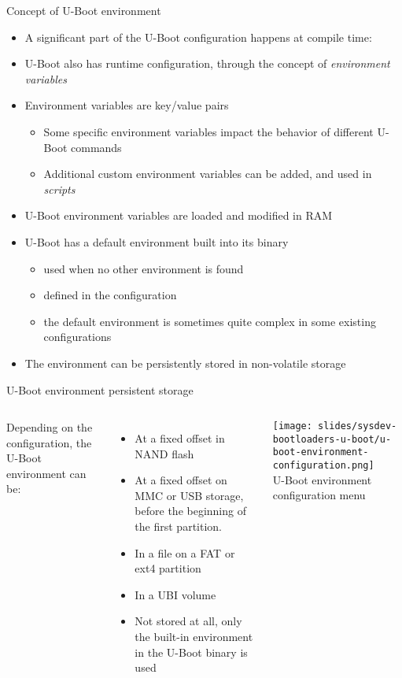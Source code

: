 \begin{frame}{Concept of U-Boot environment}
  \begin{itemize}
  \item A significant part of the U-Boot configuration happens at
    compile time: 
  \item U-Boot also has runtime configuration, through the concept of
    {\em environment variables}
  \item Environment variables are key/value pairs
    \begin{itemize}
    \item Some specific environment variables impact the behavior of
      different U-Boot commands
    \item Additional custom environment variables can be added, and
      used in {\em scripts}
    \end{itemize}
  \item U-Boot environment variables are loaded and modified in RAM
  \item U-Boot has a default environment built into its binary
    \begin{itemize}
    \item used when no other environment is found
    \item defined in the configuration
    \item the default environment is sometimes quite complex in some
      existing configurations
    \end{itemize}
  \item The environment can be persistently stored in non-volatile
    storage
  \end{itemize}
\end{frame}

\begin{frame}{U-Boot environment persistent storage}
  \begin{columns}[T]
    Depending on the configuration, the U-Boot environment can be:
    \begin{itemize}
    \item At a fixed offset in NAND flash
    \item At a fixed offset on MMC or USB storage, before the
      beginning of the first partition.
    \item In a file on a FAT or ext4 partition
    \item In a UBI volume
    \item Not stored at all, only the built-in environment in the
      U-Boot binary is used
    \end{itemize}
    \texttt{[image: slides/sysdev-bootloaders-u-boot/u-boot-environment-configuration.png]}\\
    \vspace{0.3cm}
    \tiny U-Boot environment configuration menu
  \end{columns}
\end{frame}

